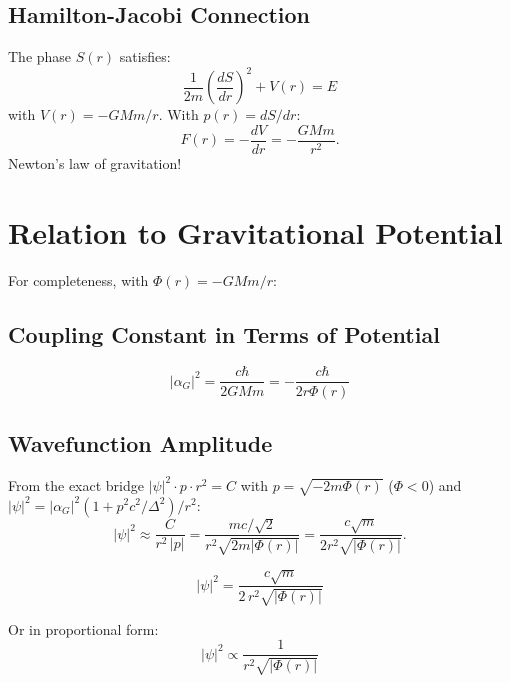 \documentclass[11pt,a4paper]{article}
\theoremstyle{definition}
\theoremstyle{remark}
\begin{document}
	\subsection{Hamilton-Jacobi Connection}
	
	The phase $S(r)$ satisfies:
	\begin{equation}
		\frac{1}{2m}\!\left(\frac{dS}{dr}\right)^2 + V(r) = E
	\end{equation}
	with $V(r)=-GMm/r$.  With $p(r)=dS/dr$:
	\begin{equation}
		F(r) = -\frac{dV}{dr} = -\frac{GMm}{r^2}.
	\end{equation}
	Newton's law of gravitation!
	
	\section{Relation to Gravitational Potential}
	
	For completeness, with $\Phi(r)=-GMm/r$:
	
	\subsection{Coupling Constant in Terms of Potential}
	
	\begin{equation}
		|\alpha_G|^2 = \frac{c\hbar}{2GMm} = -\frac{c\hbar}{2r\Phi(r)}
	\end{equation}
	
	\subsection{Wavefunction Amplitude}
	
	From the exact bridge $|\psi|^2 \cdot p \cdot r^2 = C$ with $p=\sqrt{-2m\Phi(r)}$ ($\Phi<0$) and $|\psi|^2 = |\alpha_G|^2(1+p^2c^2/\Delta^2)/r^2$:
	\begin{equation}
		|\psi|^2 \approx \frac{C}{r^2\,|p|} = \frac{mc/\sqrt{2}}{r^2\sqrt{2m|\Phi(r)|}} = \frac{c\sqrt{m}}{2r^2\sqrt{|\Phi(r)|}}.
	\end{equation}
	
	\begin{equation}
		\boxed{|\psi|^2 = \frac{c\sqrt{m}}{2\,r^2\sqrt{|\Phi(r)|}}}
	\end{equation}
	
	Or in proportional form:
	\begin{equation}
		\boxed{|\psi|^2 \propto \frac{1}{r^2\sqrt{|\Phi(r)|}}}
	\end{equation}
	
\end{document}
